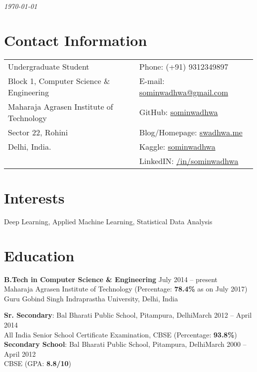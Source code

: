 \documentclass[margin,line]{res}
\begin{document}
 \hfill {\em \today}

\begin{resume}
\section{\sc Contact Information}

\vspace{.025in}
\begin{tabular}{@{}p{3.5in}p{3in}}
Undergraduate Student             & {Phone:}  (+91) 9312349897 \\
Block 1, Computer Science \& Engineering 
 & {E-mail:}  \href{mailto:sominwadhwa@gmail.com}{\color{blue}sominwadhwa@gmail.com} \\
Maharaja Agrasen Institute of Technology & {GitHub:} {\href{https://github.com/sominwadhwa}{\color{blue}sominwadhwa}}\\
Sector 22, Rohini & {Blog/Homepage:} {\href{http://www.swadhwa.me/}{\color{blue}swadhwa.me}}\\
Delhi, India.  & {Kaggle:} {\href{https://kaggle.com/sominwadhwa}{\color{blue} sominwadhwa}} \\
& {LinkedIN:} {\href{https://www.linkedin.com/in/sominwadhwa/}{\color{blue} /in/sominwadhwa}}
\end{tabular}
\section{\sc Interests}
Deep Learning, Applied Machine Learning, Statistical Data Analysis

\section{\sc Education}
{\bf B.Tech in Computer Science \& Engineering} \hfill July 2014 -- present\\
Maharaja Agrasen Institute of Technology \hfill(Percentage: {\bf 78.4\%} as on July 2017)\\
Guru Gobind Singh Indraprastha University, Delhi, India

{\bf Sr. Secondary}: Bal Bharati Public School, Pitampura, Delhi\hfill March 2012 -- April 2014\\
All India Senior School Certificate Examination, CBSE \hfill(Percentage: {\bf 93.8\%})\\
{\bf Secondary School}: Bal Bharati Public School, Pitampura, Delhi\hfill March 2000 -- April 2012\\
CBSE \hfill(GPA: {\bf 8.8/10})


\end{resume}
\end{document}

